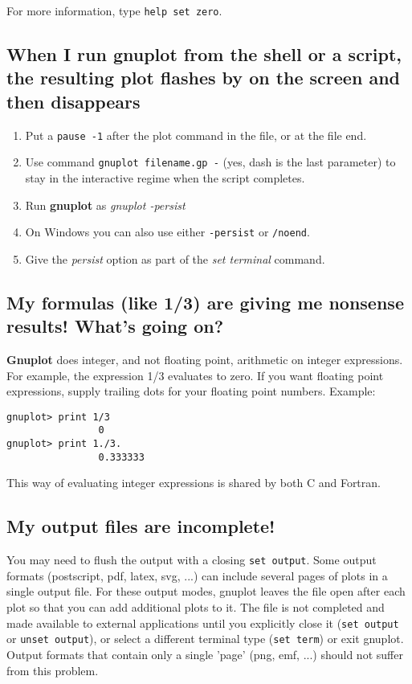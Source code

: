 \documentclass[a4paper,11pt]{article}
\newcommand{\gnuplot}{\textbf{gnuplot }}
\newcommand{\Gnuplot}{\textbf{Gnuplot }}
\begin{document}
For more information, type \verb+help set zero+.


\subsection{When I run \gnuplot from the shell or a script, the resulting plot flashes by on the screen and then disappears}

\begin{enumerate}
\item Put a \verb+pause -1+ after the plot command in the file, or at the file end.

\item Use command \verb+gnuplot filename.gp -+ (yes, dash is the last
parameter) to stay in the interactive regime when the script completes.

\item Run \gnuplot as \textit{gnuplot -persist}

\item On Windows you can also use either \verb+-persist+ or \verb+/noend+.

\item Give the \textit{persist} option as part of the \textit{set terminal} command.
\end{enumerate}



\subsection{My formulas (like 1/3) are giving me nonsense results! What's going on?}

\Gnuplot{} does integer, and not floating point, arithmetic on
integer expressions. For example, the expression 1/3 evaluates
to zero. If you want floating point expressions, supply
trailing dots for your floating point numbers. Example:


\small
\begin{verbatim}
gnuplot> print 1/3
                0
gnuplot> print 1./3.
                0.333333
\end{verbatim}
\normalsize

This way of evaluating integer expressions is shared by both C and Fortran.


\subsection{My output files are incomplete!}

You may need to flush the output with a closing \verb+set output+.
Some output formats (postscript, pdf, latex, svg, ...) can include several
pages of plots in a single output file.  For these output modes, gnuplot
leaves the file open after each plot so that you can add additional plots
to it.  The file is not completed and made available to external applications
until you explicitly close it (\verb+set output+ or \verb+unset output+),
or select a different terminal type (\verb+set term+) or exit gnuplot.
Output formats that contain only a single 'page' (png, emf, ...)
should not suffer from this problem.
\end{document}

